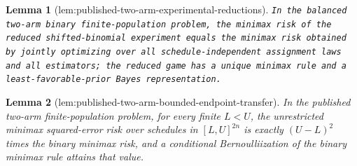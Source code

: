 \documentclass{article}
\newtheorem{lemma}{Lemma}
\begin{document}
\begin{lemma}[lem:published-two-arm-experimental-reductions]\label{lem:published-two-arm-experimental-reductions}
\texttt{In the balanced two-\allowbreak{}arm binary finite-\allowbreak{}population problem,\allowbreak{} the minimax risk of the reduced shifted-\allowbreak{}binomial experiment equals the minimax risk obtained by jointly optimizing over all schedule-\allowbreak{}independent assignment laws and all estimators;\allowbreak{} the reduced game has a unique minimax rule and a least-\allowbreak{}favorable-\allowbreak{}prior Bayes representation.}
\end{lemma}

\begin{lemma}[lem:published-two-arm-bounded-endpoint-transfer]\label{lem:published-two-arm-bounded-endpoint-transfer}
In the published two-arm finite-population problem, for every finite \(L<U\), the unrestricted minimax squared-error risk over schedules in \([L,U]^{2n}\) is exactly \((U-L)^2\) times the binary minimax risk, and a conditional Bernoulliization of the binary minimax rule attains that value.
\end{lemma}
\end{document}
